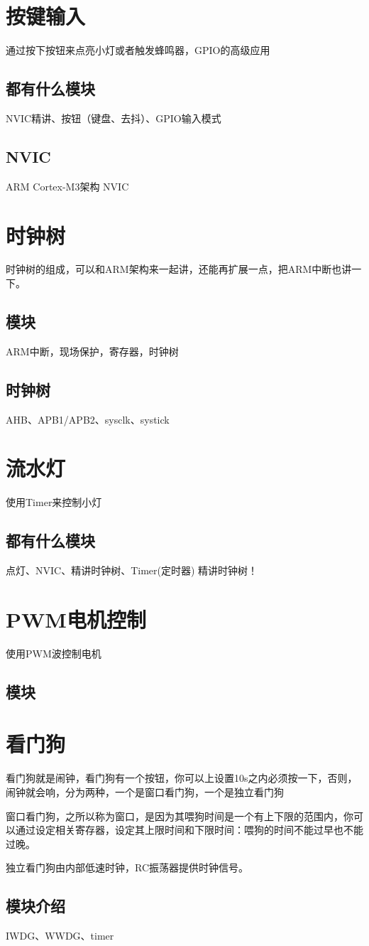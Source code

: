 \documentclass[UTF8]{ctexart}
\begin{document}
\section{按键输入}
通过按下按钮来点亮小灯或者触发蜂鸣器，GPIO的高级应用
\subsection{都有什么模块}
NVIC精讲、按钮（键盘、去抖）、GPIO输入模式
\subsection{NVIC}
ARM Cortex-M3架构 NVIC

\section{时钟树}
时钟树的组成，可以和ARM架构来一起讲，还能再扩展一点，把ARM中断也讲一下。
\subsection{模块}
ARM中断，现场保护，寄存器，时钟树
\subsection{时钟树}
AHB、APB1/APB2、sysclk、systick

\section{流水灯}
使用Timer来控制小灯
\subsection{都有什么模块}
点灯、NVIC、精讲时钟树、Timer(定时器)
精讲时钟树！

\section{PWM电机控制}
使用PWM波控制电机
\subsection{模块}


\section{看门狗}
看门狗就是闹钟，看门狗有一个按钮，你可以上设置10s之内必须按一下，否则，闹钟就会响，分为两种，一个是窗口看门狗，一个是独立看门狗

窗口看门狗，之所以称为窗口，是因为其喂狗时间是一个有上下限的范围内，你可以通过设定相关寄存器，设定其上限时间和下限时间：喂狗的时间不能过早也不能过晚。

独立看门狗由内部低速时钟，RC振荡器提供时钟信号。

\subsection{模块介绍}
IWDG、WWDG、timer
\end{document}

